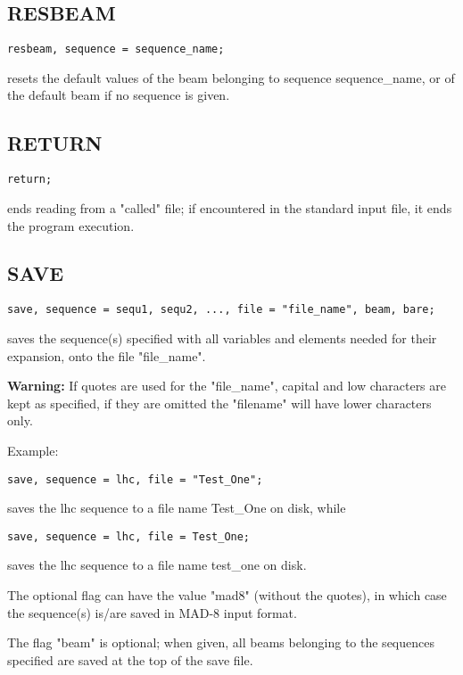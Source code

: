 \subsection{RESBEAM}
\begin{verbatim}
resbeam, sequence = sequence_name;
\end{verbatim} 
resets the default values of the beam belonging to sequence sequence\_name, or
of the default beam if no sequence is given.  


\subsection{RETURN}
\begin{verbatim}
return;
\end{verbatim} 
ends reading from a "called" file; if encountered in the standard input
file, it ends the program execution.  


\subsection{SAVE}
\label{subsec:general_save}
\begin{verbatim}
save, sequence = sequ1, sequ2, ..., file = "file_name", beam, bare;
\end{verbatim} 
saves the sequence(s) specified with all variables and elements needed
for their expansion, onto the file "file\_name". 

{\bf Warning:} If quotes are used for
the "file\_name", capital and low characters are kept as specified, if they
are omitted the "filename" will have lower characters only. 

Example:
\begin{verbatim}
save, sequence = lhc, file = "Test_One";
\end{verbatim}
saves the lhc sequence to a file name Test\_One on disk, while
\begin{verbatim}
save, sequence = lhc, file = Test_One;
\end{verbatim}
saves the lhc sequence to a file name test\_one on disk.

The optional
flag can have the value "mad8" (without the quotes), in which case the
sequence(s) is/are saved in MAD-8 input format.  

The flag "beam" is optional; when given, all beams belonging to the
sequences specified are saved at the top of the save file.  

